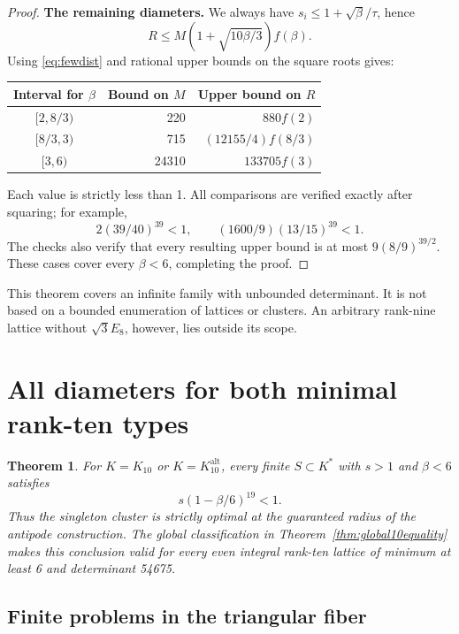 \documentclass[11pt,a4paper]{article}
\newtheorem{theorem}{Theorem}[section]
\theoremstyle{remark}\newtheorem{remark}[theorem]{Remark}
\newcommand{\Kalt}{K_{10}^{\mathrm{alt}}}
\begin{document}
\begin{proof}
\textbf{The remaining diameters.} We always have $s_i\le1+\sqrt\beta/\tau$, hence
\[
R\le M(1+\sqrt{10\beta/3})f(\beta).
\]
Using \eqref{eq:fewdist} and rational upper bounds on the square roots gives:
\begin{center}
\begin{tabular}{crr}
\toprule
Interval for $\beta$ & Bound on $M$ & Upper bound on $R$\\\midrule
$[2,8/3)$ &220&$880f(2)$\\
$[8/3,3)$ &715&$(12155/4)f(8/3)$\\
$[3,6)$ &24310&$133705f(3)$\\
\bottomrule
\end{tabular}
\end{center}
Each value is strictly less than 1. All comparisons are verified exactly after squaring; for example,
\[
2(39/40)^{39}<1,\qquad (1600/9)(13/15)^{39}<1.
\]
The checks also verify that every resulting upper bound is at most $9(8/9)^{39/2}$. These cases cover every $\beta<6$, completing the proof.
\end{proof}

This theorem covers an infinite family with unbounded determinant. It is not based on a bounded enumeration of lattices or clusters. An arbitrary rank-nine lattice without $\sqrt3E_8$, however, lies outside its scope.

\section{All diameters for both minimal rank-ten types}

\begin{theorem}\label{thm:cluster10}
For $K=K_{10}$ or $K=\Kalt$, every finite $S\subset K^*$ with $s>1$ and $\beta<6$ satisfies
\[
s(1-\beta/6)^{19}<1.
\]
Thus the singleton cluster is strictly optimal at the guaranteed radius of the antipode construction. The global classification in Theorem~\ref{thm:global10equality} makes this conclusion valid for every even integral rank-ten lattice of minimum at least 6 and determinant 54675.
\end{theorem}

\subsection{Finite problems in the triangular fiber}
\end{document}
